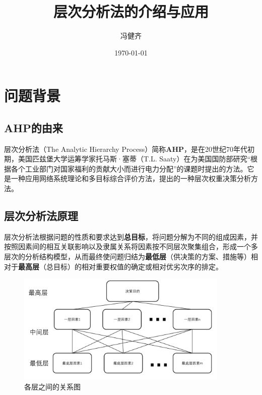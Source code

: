 \documentclass{ctexart}
\title{\vspace{+4cm}\textbf{层次分析法的介绍与应用}}
\author{冯健齐}
\date{\today}
\begin{document}
\maketitle
\newpage
{}
\setcounter{page}{0}
\tableofcontents
\newpage
\setcounter{page}{1}

\section{问题背景}
\subsection{AHP的由来}
\setlength{\parindent}{2em}层次分析法（The Analytic Hierarchy Process）简称\textbf{AHP}，是在20世纪70年代初期，美国匹兹堡大学运筹学家托马斯·塞蒂（T.L. Saaty）在为美国国防部研究“根据各个工业部门对国家福利的贡献大小而进行电力分配”的课题时提出的方法。它是一种应用网络系统理论和多目标综合评价方法，提出的一种层次权重决策分析方法。
\subsection{层次分析法原理}
\setlength{\parindent}{2em}层次分析法根据问题的性质和要求达到\textbf{总目标}，将问题分解为不同的组成因素，并按照因素间的相互关联影响以及隶属关系将因素按不同层次聚集组合，形成一个多层次的分析结构模型，从而最终使问题归结为\textbf{最低层}（供决策的方案、措施等）相对于\textbf{最高层}（总目标）的相对重要权值的确定或相对优劣次序的排定。
\begin{figure}[h!]
    \centering
    \includegraphics[width=0.9\textwidth]{001.JPG}
    \caption{各层之间的关系图}
\end{figure} 
\end{document}
